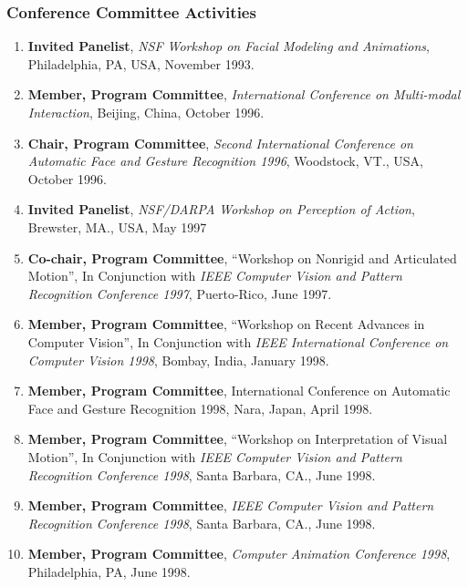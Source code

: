 \subsubsection{Conference Committee Activities}
\label{subsubsec:mylabel4}

\begin{enumerate}

\item {\bf Invited Panelist}, \textit{NSF Workshop on Facial Modeling and
Animations}, Philadelphia, PA, USA, November 1993.

\item {\bf Member, Program Committee}, \textit{International Conference on
Multi-modal Interaction}, Beijing, China, October 1996.

\item {\bf Chair, Program Committee}, \textit{Second International Conference on
Automatic Face and Gesture Recognition 1996}, Woodstock, VT., USA,
October 1996.

\item {\bf Invited Panelist}, \textit{NSF/DARPA Workshop on Perception of
Action}, Brewster, MA., USA, May 1997

\item {\bf Co-chair, Program Committee}, ``Workshop on Nonrigid and
Articulated Motion'', In Conjunction with \textit{IEEE Computer
Vision and Pattern Recognition Conference 1997}, Puerto-Rico, June
1997.

\item {\bf Member, Program Committee}, ``Workshop on Recent Advances in
Computer Vision'', In Conjunction with \textit{IEEE International
Conference on Computer Vision 1998}, Bombay, India, January 1998.

\item {\bf Member, Program Committee}, International Conference on
Automatic Face and Gesture Recognition 1998, Nara, Japan, April
1998.

\item {\bf Member, Program Committee}, ``Workshop on Interpretation of
Visual Motion'', In Conjunction with \textit{IEEE Computer Vision
and Pattern Recognition Conference 1998}, Santa Barbara, CA., June
1998.

\item {\bf Member, Program Committee}, \textit{IEEE Computer Vision and Pattern
Recognition Conference 1998}, Santa Barbara, CA., June 1998.

\item {\bf Member, Program Committee}, \textit{Computer Animation
Conference 1998}, Philadelphia, PA, June 1998.


\end{enumerate}
